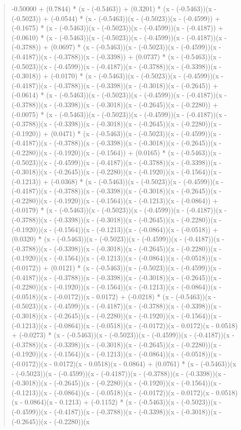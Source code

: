 \documentclass[a4paper, 12pt]{article}
\begin{document}
\begin{quote}
-0.50000 + (0.7844) * (x - (-0.5463)) + (0.3201) * (x - (-0.5463))(x - (-0.5023)) + (-0.0544) * (x - (-0.5463))(x - (-0.5023))(x - (-0.4599)) + (-0.1675) * (x - (-0.5463))(x - (-0.5023))(x - (-0.4599))(x - (-0.4187)) + (-0.0610) * (x - (-0.5463))(x - (-0.5023))(x - (-0.4599))(x - (-0.4187))(x - (-0.3788)) + (0.0697) * (x - (-0.5463))(x - (-0.5023))(x - (-0.4599))(x - (-0.4187))(x - (-0.3788))(x - (-0.3398)) + (0.0737) * (x - (-0.5463))(x - (-0.5023))(x - (-0.4599))(x - (-0.4187))(x - (-0.3788))(x - (-0.3398))(x - (-0.3018)) + (-0.0170) * (x - (-0.5463))(x - (-0.5023))(x - (-0.4599))(x - (-0.4187))(x - (-0.3788))(x - (-0.3398))(x - (-0.3018))(x - (-0.2645)) + (-0.0614) * (x - (-0.5463))(x - (-0.5023))(x - (-0.4599))(x - (-0.4187))(x - (-0.3788))(x - (-0.3398))(x - (-0.3018))(x - (-0.2645))(x - (-0.2280)) + (-0.0075) * (x - (-0.5463))(x - (-0.5023))(x - (-0.4599))(x - (-0.4187))(x - (-0.3788))(x - (-0.3398))(x - (-0.3018))(x - (-0.2645))(x - (-0.2280))(x - (-0.1920)) + (0.0471) * (x - (-0.5463))(x - (-0.5023))(x - (-0.4599))(x - (-0.4187))(x - (-0.3788))(x - (-0.3398))(x - (-0.3018))(x - (-0.2645))(x - (-0.2280))(x - (-0.1920))(x - (-0.1564)) + (0.0165) * (x - (-0.5463))(x - (-0.5023))(x - (-0.4599))(x - (-0.4187))(x - (-0.3788))(x - (-0.3398))(x - (-0.3018))(x - (-0.2645))(x - (-0.2280))(x - (-0.1920))(x - (-0.1564))(x - (-0.1213)) + (-0.0368) * (x - (-0.5463))(x - (-0.5023))(x - (-0.4599))(x - (-0.4187))(x - (-0.3788))(x - (-0.3398))(x - (-0.3018))(x - (-0.2645))(x - (-0.2280))(x - (-0.1920))(x - (-0.1564))(x - (-0.1213))(x - (-0.0864)) + (-0.0179) * (x - (-0.5463))(x - (-0.5023))(x - (-0.4599))(x - (-0.4187))(x - (-0.3788))(x - (-0.3398))(x - (-0.3018))(x - (-0.2645))(x - (-0.2280))(x - (-0.1920))(x - (-0.1564))(x - (-0.1213))(x - (-0.0864))(x - (-0.0518)) + (0.0320) * (x - (-0.5463))(x - (-0.5023))(x - (-0.4599))(x - (-0.4187))(x - (-0.3788))(x - (-0.3398))(x - (-0.3018))(x - (-0.2645))(x - (-0.2280))(x - (-0.1920))(x - (-0.1564))(x - (-0.1213))(x - (-0.0864))(x - (-0.0518))(x - (-0.0172)) + (0.0121) * (x - (-0.5463))(x - (-0.5023))(x - (-0.4599))(x - (-0.4187))(x - (-0.3788))(x - (-0.3398))(x - (-0.3018))(x - (-0.2645))(x - (-0.2280))(x - (-0.1920))(x - (-0.1564))(x - (-0.1213))(x - (-0.0864))(x - (-0.0518))(x - (-0.0172))(x - 0.0172) + (-0.0218) * (x - (-0.5463))(x - (-0.5023))(x - (-0.4599))(x - (-0.4187))(x - (-0.3788))(x - (-0.3398))(x - (-0.3018))(x - (-0.2645))(x - (-0.2280))(x - (-0.1920))(x - (-0.1564))(x - (-0.1213))(x - (-0.0864))(x - (-0.0518))(x - (-0.0172))(x - 0.0172)(x - 0.0518) + (-0.0273) * (x - (-0.5463))(x - (-0.5023))(x - (-0.4599))(x - (-0.4187))(x - (-0.3788))(x - (-0.3398))(x - (-0.3018))(x - (-0.2645))(x - (-0.2280))(x - (-0.1920))(x - (-0.1564))(x - (-0.1213))(x - (-0.0864))(x - (-0.0518))(x - (-0.0172))(x - 0.0172)(x - 0.0518)(x - 0.0864) + (0.0761) * (x - (-0.5463))(x - (-0.5023))(x - (-0.4599))(x - (-0.4187))(x - (-0.3788))(x - (-0.3398))(x - (-0.3018))(x - (-0.2645))(x - (-0.2280))(x - (-0.1920))(x - (-0.1564))(x - (-0.1213))(x - (-0.0864))(x - (-0.0518))(x - (-0.0172))(x - 0.0172)(x - 0.0518)(x - 0.0864)(x - 0.1213) + (-0.1152) * (x - (-0.5463))(x - (-0.5023))(x - (-0.4599))(x - (-0.4187))(x - (-0.3788))(x - (-0.3398))(x - (-0.3018))(x - (-0.2645))(x - (-0.2280))(x 
\end{quote}
\end{document}

